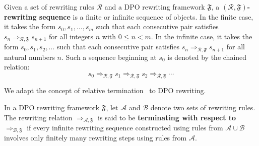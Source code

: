 \begin{definition}  
Given a set of rewriting rules $\mathcal{R}$ and a DPO rewriting framework $\mathfrak{F}$, a \textbf{$(\mathcal{R}, \mathfrak{F})$-rewriting sequence} is a finite or infinite sequence of objects. In the finite case, it takes the form $s_0, s_1, \dots, s_m$ such that each consecutive pair satisfies $s_n \mathop{\Rightarrow}_{\mathcal{R}, \mathfrak{F}} s_{n+1}$ for all integers $n$ with $0 \leq n < m$. In the infinite case, it takes the form $s_0, s_1, s_2, \dots$ such that each consecutive pair satisfies $s_n \mathop{\Rightarrow}_{\mathcal{R}, \mathfrak{F}} s_{n+1}$ for all natural numbers $n$. Such a sequence beginning at $s_0$ is denoted by the chained relation:  
\[
s_0 \mathop{\Rightarrow}_{\mathcal{R}, \mathfrak{F}} s_1 \mathop{\Rightarrow}_{\mathcal{R}, \mathfrak{F}} s_2 \mathop{\Rightarrow}_{\mathcal{R}, \mathfrak{F}} \cdots
\]   
\end{definition}  
We adapt the concept of relative termination~\cite{klop1987term,geser1990relative} to DPO rewriting.
\begin{definition}  
\label{termination:def:relative_termination}  
In a DPO rewriting framework $\mathfrak{F}$, let $\mathcal{A}$ and $\mathcal{B}$ denote two sets of rewriting rules. The rewriting relation $\mathop{\Rightarrow}_{\mathcal{A},\mathfrak{F}}$ is said to be \textbf{terminating with respect to} $\mathop{\Rightarrow}_{\mathcal{B},\mathfrak{F}}$ if every infinite rewriting sequence constructed using rules from $\mathcal{A} \mathop{\cup} \mathcal{B}$ involves only finitely many rewriting steps using rules from $\mathcal{A}$.  
\end{definition}  

